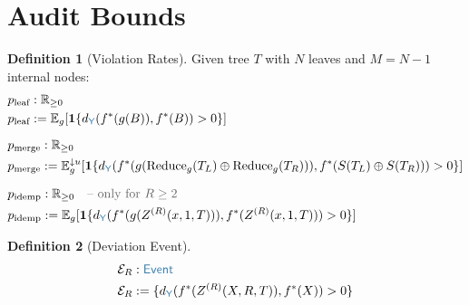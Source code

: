 \documentclass[11pt]{article}
\theoremstyle{definition}
\newtheorem{defnenv}{Definition}
\theoremstyle{plain}
\newcommand{\ty}[1]{\textcolor{type}{\mathsf{#1}}}
\newcommand{\fn}[1]{\mathrm{#1}}
\newcommand{\cmt}[1]{\textcolor{comment}{\text{-- #1}}}
\newcommand{\defeq}{:=}
\newcommand{\Y}{\ty{Y}}
\newcommand{\Rnn}{\mathbb{R}_{\geq 0}}
\newcommand{\fstar}{f^*}
\newcommand{\dY}{d_{\Y}}
\newcommand{\concat}{\oplus}
\newcommand{\Eg}{\mathbb{E}_g}
\newcommand{\Egu}[1]{\mathbb{E}_g^{\downarrow #1}}
\newcommand{\reduce}{\fn{Reduce}_g}
\newcommand{\ZR}{Z^{(R)}}
\begin{document}
\section{Audit Bounds}
\label{sec:audit}

\begin{defnenv}[Violation Rates]
\label{def:violation}
Given tree $T$ with $N$ leaves and $M = N - 1$ internal nodes:
\begin{align*}
&p_{\text{leaf}} : \Rnn \\
&p_{\text{leaf}} \defeq \Eg[\mathbf{1}\{\dY(\fstar(g(B)), \fstar(B)) > 0\}] \\[6pt]
&p_{\text{merge}} : \Rnn \\
&p_{\text{merge}} \defeq \Egu{u}[\mathbf{1}\{\dY(\fstar(g(\reduce(T_L) \concat \reduce(T_R))), \fstar(S(T_L) \concat S(T_R))) > 0\}] \\[6pt]
&p_{\text{idemp}} : \Rnn \quad\cmt{only for $R \geq 2$} \\
&p_{\text{idemp}} \defeq \Eg[\mathbf{1}\{\dY(\fstar(g(\ZR(x, 1, T))), \fstar(\ZR(x, 1, T))) > 0\}]
\end{align*}
\end{defnenv}

\begin{defnenv}[Deviation Event]
\label{def:deviation}
\begin{align*}
&\mathcal{E}_R : \ty{Event} \\
&\mathcal{E}_R \defeq \{\dY(\fstar(\ZR(X, R, T)), \fstar(X)) > 0\}
\end{align*}
\end{defnenv}
\end{document}
